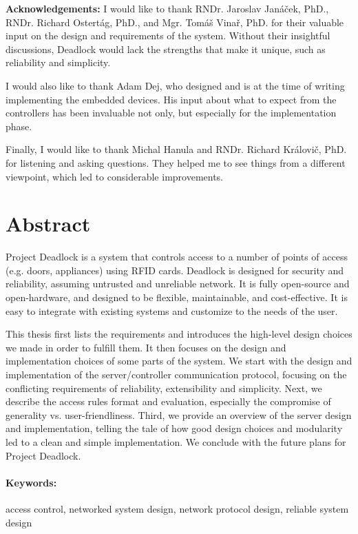 \vfill
\noindent\textbf{Acknowledgements:} I would like to thank RNDr. Jaroslav Janáček, PhD., RNDr. Richard Ostertág, PhD., and Mgr. Tomáš Vinař, PhD. for their valuable input on the design and requirements of the system. Without their insightful discussions, Deadlock would lack the strengths that make it unique, such as reliability and simplicity.

I would also like to thank Adam Dej, who designed and is at the time of writing implementing the embedded devices. His input about what to expect from the controllers has been invaluable not only, but especially for the implementation phase.

Finally, I would like to thank Michal Hanula and RNDr. Richard Královič, PhD. for listening and asking questions. They helped me to see things from a different viewpoint, which led to considerable improvements.


\newpage
\section*{Abstract}

Project Deadlock is a system that controls access to a number of points of
access (e.g. doors, appliances) using RFID cards. Deadlock is designed for
security and reliability, assuming untrusted and unreliable network. It is fully open-source and open-hardware, and designed  to be flexible, maintainable, and cost-effective. It is easy to integrate with existing systems and customize to the needs of the user.

This thesis first lists the requirements and introduces the high-level design choices we made in order to fulfill them.
It then focuses on the design and implementation choices of some parts of the system.
We start with the design and implementation of the server/controller communication protocol, focusing on the conflicting requirements of reliability, extensibility and simplicity.
Next, we describe the access rules format and evaluation, especially the compromise of generality vs. user-friendliness.
Third, we provide an overview of the server design and implementation, telling the tale of how good design choices and modularity led to a clean and simple implementation.
We conclude with the future plans for Project Deadlock.

\paragraph*{Keywords:} access control, networked system design, network protocol design, reliable system design

